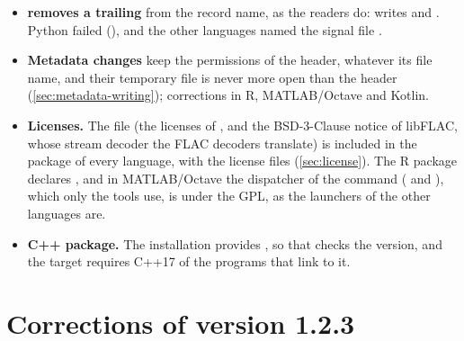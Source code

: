 \begin{itemize}
  touched. C++, Rust and Julia wrote such annotations with the code 0,
  which is not an annotation code; Python, R and Kotlin refused even an
  empty list, which now writes an empty file, as in the other languages.
\item \textbf{ removes a trailing } from the
  record name, as the readers do: 
  writes  and . Python failed (), and the other languages named the signal
  file .
\item \textbf{Metadata changes} keep the permissions of the header, whatever
  its file name, and their temporary file is never more open than the header
  (\cref{sec:metadata-writing}); corrections in R, MATLAB/Octave and
  Kotlin.
\item \textbf{Licenses.} The file  (the licenses of
  \wfdbx{}, and the BSD-3-Clause notice of libFLAC, whose stream decoder the
  FLAC decoders translate) is included in the package of every language,
  with the license files (\cref{sec:license}). The R package declares
  , and in MATLAB/Octave the dispatcher of the
   command ( and
  ), which only the tools use, is under the GPL, as the
  launchers of the other languages are.
\item \textbf{C++ package.} The installation provides
  , so that
   checks the version, and
  the  target requires C++17 of the programs that link to it.
\end{itemize}

\section{Corrections of version 1.2.3}
\label{sec:corrections-1-2-3}

